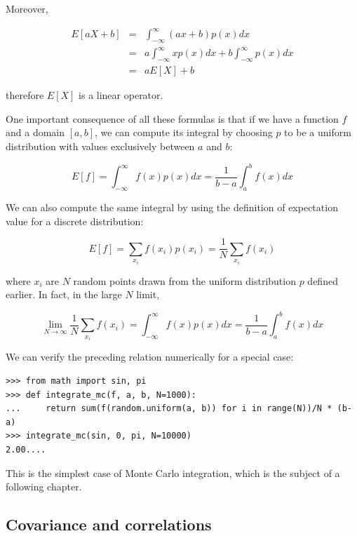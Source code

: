 \documentclass[justified, sixbynine]{tufte-book}
\def\ft{\small\tt}
\theoremstyle{plain}%
\newtheorem * {corollary}{Corollary}
\theoremstyle{definition}
\theoremstyle{remark}
\newtheorem * {remark}{Remark}
\newtheorem * {note}{Note}
\begin{document}
\begin{fullwidth}
Moreover, 

\begin{eqnarray}
E[aX+b] &=&\int_{-\infty }^\infty (ax+b)p(x)dx \\
&=&a\int_{-\infty }^\infty xp(x)dx+b\int_{-\infty }^\infty p(x)dx \\
&=&aE[X]+b
\end{eqnarray}

therefore $E[X]$ is a linear operator.

One important consequence of all these formulas is that if we have a function $f$ and a domain $[a, b]$, we can compute its integral by choosing $p$ to be a uniform distribution with values exclusively between $a$ and $b$:

\begin{equation}
  E[f] = \int_{-\infty }^\infty f(x) p(x) dx = \frac1{b-a}\int_a^b f(x) dx
\end{equation}

We can also compute the same integral by using the definition of expectation value for a discrete distribution:

\begin{equation}
  E[f] = \sum_{x_i} f(x_i) p(x_i) = \frac1N \sum_{x_i} f(x_i)
\end{equation}

where $x_i$ are $N$ random points drawn from the uniform distribution $p$ defined earlier. In fact, in the large $N$ limit, 

\begin{equation}
  \lim_{N\rightarrow \infty}  \frac1N \sum_{x_i} f(x_i) = \int_{-\infty }^\infty f(x) p(x)dx = \frac1{b-a}\int_a^b f(x) dx
\end{equation}

We can verify the preceding relation numerically for a special case:

\begin{lstlisting}[caption={in file: {\ft nlib.py}}]
>>> from math import sin, pi
>>> def integrate_mc(f, a, b, N=1000):
...     return sum(f(random.uniform(a, b)) for i in range(N))/N * (b-a)
>>> integrate_mc(sin, 0, pi, N=10000)
2.00....
\end{lstlisting}

This is the simplest case of Monte Carlo integration, which is the subject of a following chapter.

\goodbreak\subsection{Covariance and correlations}


\end{fullwidth}
\end{document}
